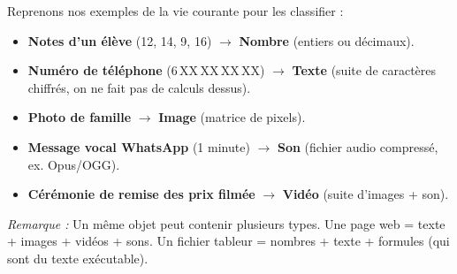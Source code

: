 \documentclass[11pt]{article}
\begin{document}
\noindent
Reprenons nos exemples de la vie courante pour les classifier :

\begin{exemplebox}
\begin{itemize}
    \item \textbf{Notes d'un élève} (12, 14, 9, 16) $\rightarrow$ \textbf{Nombre} (entiers ou décimaux).
    \item \textbf{Numéro de téléphone} (6\,XX\,XX\,XX\,XX) $\rightarrow$ \textbf{Texte} (suite de caractères chiffrés, on ne fait pas de calculs dessus).
    \item \textbf{Photo de famille} $\rightarrow$ \textbf{Image} (matrice de pixels).
    \item \textbf{Message vocal WhatsApp} (1 minute) $\rightarrow$ \textbf{Son} (fichier audio compressé, ex. Opus/OGG).
    \item \textbf{Cérémonie de remise des prix filmée} $\rightarrow$ \textbf{Vidéo} (suite d'images + son).
\end{itemize}
\emph{Remarque :} Un même objet peut contenir plusieurs types. Une page web = texte + images + vidéos + sons. Un fichier tableur = nombres + texte + formules (qui sont du texte exécutable).
\end{exemplebox}
\end{document}
